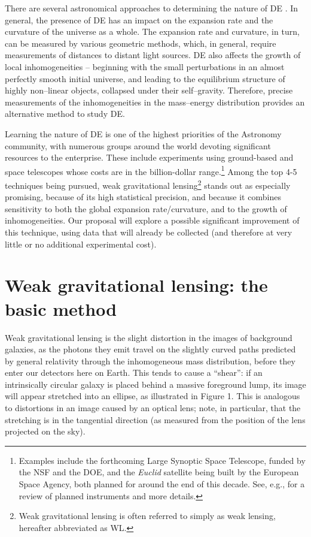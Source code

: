 \documentclass[10pt, preprint]{aastex}
\begin{document}
There are several astronomical approaches to determining the nature of
DE \citep{DETF}.  In general, the presence of DE has an impact on the
expansion rate and the curvature of the universe as a whole.  The
expansion rate and curvature, in turn, can be measured by various
geometric methods, which, in general, require measurements of
distances to distant light sources. DE also affects the growth of local
inhomogeneities -- beginning with the small perturbations in an almost
perfectly smooth initial universe, and leading to the equilibrium
structure of highly non--linear objects, collapsed under their
self--gravity.  Therefore, precise measurements of the inhomogeneities
in the mass--energy distribution provides an alternative method to
study DE.

Learning the nature of DE is one of the highest priorities of the
Astronomy community, with numerous groups around the world devoting
significant resources to the enterprise.  These include experiments
using ground-based and space telescopes whose costs are in the
billion-dollar range.\footnote{Examples include the forthcoming Large
  Synoptic Space Telescope, funded by the NSF and the DOE, and the
  {\it Euclid} satellite being built by the European Space Agency,
  both planned for around the end of this decade.  See, e.g.,
  \citet{Munshireview} for a review of planned instruments and more
  details.} Among the top 4-5 techniques being pursued, weak
gravitational lensing\footnote{Weak gravitational lensing is often
  referred to simply as weak lensing, hereafter abbreviated as WL.}
stands out as especially promising, because of its high statistical
precision, and because it combines sensitivity to both the global
expansion rate/curvature, and to the growth of inhomogeneities.  Our
proposal will explore a possible significant improvement of this
technique, using data that will already be collected (and therefore at
very little or no additional experimental cost).

\section{Weak gravitational lensing: the basic method}

Weak gravitational lensing is the slight distortion in the images of
background galaxies, as the photons they emit travel on the slightly
curved paths predicted by general relativity through the inhomogeneous
mass distribution, before they enter our detectors here on Earth.
This tends to cause a ``shear'': if an intrinsically circular galaxy
is placed behind a massive foreground lump, its image will appear
stretched into an ellipse, as illustrated in Figure 1.  This is
analogous to distortions in an image caused by an optical lens; note,
in particular, that the stretching is in the tangential direction (as
measured from the position of the lens projected on the sky).
\end{document}
